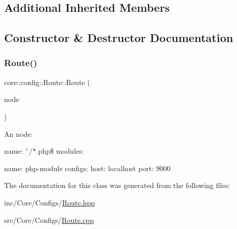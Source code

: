 \subsection*{Additional Inherited Members}


\subsection{Constructor \& Destructor Documentation}
\mbox{\label{classcore_1_1config_1_1Route_ae4cd245ca558e741202ebab6fa13e4e0}} 
\subsubsection{\texorpdfstring{Route()}{Route()}}
{\footnotesize\ttfamily core\+::config\+::\+Route\+::\+Route (\begin{DoxyParamCaption}\item[{const \hyperlink{classIConfigNode}{I\+Config\+Node} \&}]{node }\end{DoxyParamCaption})}

An node\+:
\begin{DoxyItemize}
\item name\+: $^\wedge$/$\ast$.php\$ modules\+:
\begin{DoxyItemize}
\item name\+: php-\/module configs\+: host\+: localhost port\+: 9000 
\end{DoxyItemize}
\end{DoxyItemize}

The documentation for this class was generated from the following files\+:\begin{DoxyCompactItemize}
\item 
inc/\+Core/\+Configs/\hyperlink{Route_8hpp}{Route.\+hpp}\item 
src/\+Core/\+Configs/\hyperlink{Route_8cpp}{Route.\+cpp}\end{DoxyCompactItemize}
